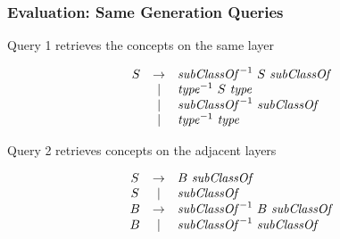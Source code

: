 \documentclass[xcolor=table]{beamer}
\begin{document}
            
\begin{frame}
  \transwipe[direction=90]
  \frametitle{Evaluation: Same Generation Queries}
Query 1 retrieves the concepts on the same layer

\begin{figure}[h]
   \[
\begin{array}{ccl}
   S & \rightarrow & \text{\emph{subClassOf}}^{-1} \ S \ \text{\emph{subClassOf}} \\ 
     & |           & \text{\emph{type}}^{-1} \ S \ \text{\emph{type}} \\ 
     & |           & \text{\emph{subClassOf}}^{-1} \ \text{\emph{subClassOf}} \\ 
     & |           & \text{\emph{type}}^{-1} \ \text{\emph{type}} \\ 
\end{array}
\]

\end{figure}

Query 2 retrieves concepts on the adjacent layers

\begin{figure}[h]
   \[
\begin{array}{ccl}
   S & \rightarrow & B \ \text{\emph{subClassOf}} \\ 
   S & |           & \text{\emph{subClassOf}} \\ 
   B & \rightarrow & \text{\emph{subClassOf}}^{-1} \ B \ \text{\emph{subClassOf}} \\ 
   B & |           & \text{\emph{subClassOf}}^{-1} \ \text{\emph{subClassOf}} \\ 
\end{array}
\]
\end{figure}

\end{frame}
            
\end{document}
